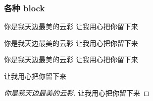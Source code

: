 \documentclass[aspectratio=1610,linespread=1.2]{ctexbeamer}
\begin{document}
\begin{frame}%
  \frametitle{各种 block}

  \begin{block}{你是我天边最美的云彩}
    让我用心把你留下来
  \end{block}

  \begin{exampleblock}{你是我天边最美的云彩}
    让我用心把你留下来
  \end{exampleblock}

  \begin{alertblock}{你是我天边最美的云彩}
    让我用心把你留下来
  \end{alertblock}

  \begin{theorem}[你是我天边最美的云彩]
    让我用心把你留下来
  \end{theorem}

  \begin{proof}[你是我天边最美的云彩]
    让我用心把你留下来
  \end{proof}
\end{frame}
\end{document}
